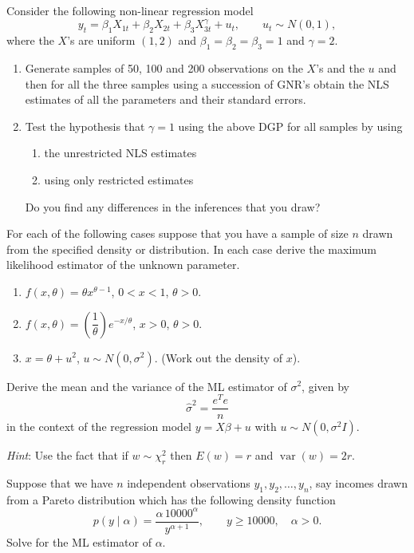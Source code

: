 \documentclass[11pt]{article}
\begin{document}
Consider the following non-linear regression model
\begin{equation}\tag{2}
  y_t = \beta_1 X_{1t} + \beta_2 X_{2t} + \beta_3 X_{3t}^{\gamma} + u_t,
  \qquad u_t \sim N(0,1),
\end{equation}
where the $X$'s are uniform $(1,2)$ and
$\beta_1=\beta_2=\beta_3=1$ and $\gamma=2$.
\begin{enumerate}[label=(\alph*),leftmargin=2em,itemsep=5pt,topsep=3pt]
\item Generate samples of 50, 100 and 200 observations on the $X$'s and
the $u$ and then for all the three samples using a succession of GNR's
obtain the NLS estimates of all the parameters and their standard errors.
\item Test the hypothesis that $\gamma=1$ using the above DGP for all
samples by using
\begin{enumerate}[label=(\roman*),leftmargin=2em,itemsep=2pt,topsep=3pt]
\item the unrestricted NLS estimates
\item using only restricted estimates
\end{enumerate}
Do you find any differences in the inferences that you draw?
\end{enumerate}

\newpage
{}
For each of the following cases suppose that you have a sample of size
$n$ drawn from the specified density or distribution. In each case derive
the maximum likelihood estimator of the unknown parameter.
\begin{enumerate}[label=(\alph*),leftmargin=2em,itemsep=8pt,topsep=6pt]
\item $f(x,\theta)=\theta x^{\theta-1}$, $0<x<1$, $\theta>0$.
\item $f(x,\theta)=\left(\dfrac{1}{\theta}\right)e^{-x/\theta}$,
$x>0$, $\theta>0$.
\item $x=\theta+u^2$, $u\sim N(0,\sigma^2)$.
(Work out the density of $x$).
\end{enumerate}

Derive the mean and the variance of the ML estimator of $\sigma^2$, given by
\[
  \hat{\sigma}^2=\frac{e^{T}e}{n}
\]
in the context of the regression model $y=X\beta+u$ with
$u\sim N(0,\sigma^2 I)$.

\emph{Hint}: Use the fact that if $w\sim\chi_r^2$ then $E(w)=r$ and
$\operatorname{var}(w)=2r$.

Suppose that we have $n$ independent observations $y_1,y_2,\ldots,y_n$, say
incomes drawn from a Pareto distribution which has the following density
function
\[
  p(y\mid\alpha)=\frac{\alpha\,10000^{\alpha}}{y^{\alpha+1}},
  \qquad y\geq 10000,\quad \alpha>0.
\]
Solve for the ML estimator of $\alpha$.
\end{document}
